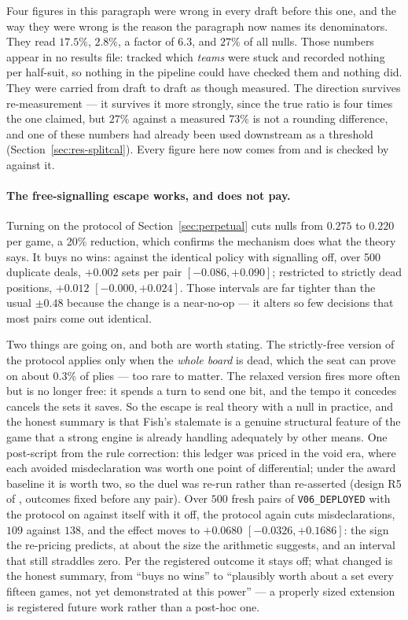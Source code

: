 \documentclass[11pt,letterpaper]{article}
\begin{document}
Four figures in this paragraph were wrong in every draft before this one, and
the way they were wrong is the reason the paragraph now names its denominators.
They read $17.5\%$, $2.8\%$, a factor of $6.3$, and $27\%$ of all nulls. Those
numbers appear in no results file:  tracked which
\emph{teams} were stuck and recorded nothing per half-suit, so nothing in the
pipeline could have checked them and nothing did. They were carried from draft
to draft as though measured. The direction survives re-measurement --- it
survives it more strongly, since the true ratio is four times the one claimed,
but $27\%$ against a measured $73\%$ is not a rounding difference, and one
of these numbers had already been used downstream as a threshold
(Section~\ref{sec:res-splitcal}). Every figure here now comes from
 and is checked by
 against it.

\paragraph{The free-signalling escape works, and does not pay.} Turning on the
protocol of Section~\ref{sec:perpetual} cuts nulls from $0.275$ to $0.220$ per
game, a 20\% reduction, which confirms the mechanism does what the theory says.
It buys no wins: against the identical policy with signalling off, over 500
duplicate deals, $+0.002$ sets per pair $[-0.086, +0.090]$; restricted to
strictly dead positions, $+0.012$ $[-0.000, +0.024]$. Those intervals are far
tighter than the usual $\pm 0.48$ because the change is a near-no-op --- it alters
so few decisions that most pairs come out identical.

Two things are going on, and both are worth stating. The strictly-free version
of the protocol applies only when the \emph{whole board} is dead, which the seat
can prove on about 0.3\% of plies --- too rare to matter. The relaxed version
fires more often but is no longer free: it spends a turn to send one bit, and
the tempo it concedes cancels the sets it saves. So the escape is real theory
with a null in practice, and the honest summary is that Fish's stalemate is a
genuine structural feature of the game that a strong engine is already handling
adequately by other means. One post-script from the rule correction: this
ledger was priced in the void era, where each avoided misdeclaration was
worth one point of differential; under the award baseline it is worth two,
so the duel was re-run rather than re-asserted (design R5 of
, outcomes fixed before any pair).
Over $500$ fresh pairs of \texttt{V06\_DEPLOYED} with the protocol on
against itself with it off, the protocol again cuts misdeclarations,
$109$ against $138$, and the effect moves to $+0.0680$
$[-0.0326, +0.1686]$: the sign the re-pricing predicts, at about the size
the arithmetic suggests, and an interval that still straddles zero. Per
the registered outcome it stays off; what changed is the honest summary,
from ``buys no wins'' to ``plausibly worth about a set every fifteen
games, not yet demonstrated at this power'' --- a properly sized
extension is registered future work rather than a post-hoc one.
\end{document}
